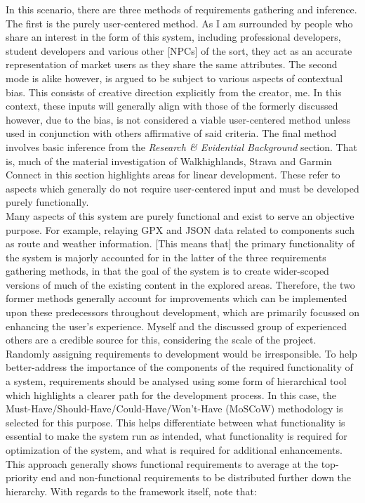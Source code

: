 \documentclass[11pt, english]{article}
\begin{document}
	In this scenario, there are three methods of requirements gathering and inference. The first is the purely user-centered method. As I am surrounded by people who share an interest in the form of this system, including professional developers, student developers and various other [NPCs] of the sort, they act as an accurate representation of market users as they share the same attributes. The second mode is alike however, is argued to be subject to various aspects of contextual bias. This consists of creative direction explicitly from the creator, me. In this context, these inputs will generally align with those of the formerly discussed however, due to the bias, is not considered a viable user-centered method unless used in conjunction with others affirmative of said criteria. The final method involves basic inference from the \textit{Research \& Evidential Background} section. That is, much of the material investigation of Walkhighlands, Strava and Garmin Connect in this section highlights areas for linear development. These refer to aspects which generally do not require user-centered input and must be developed purely functionally.\\

	Many aspects of this system are purely functional and exist to serve an objective purpose. For example, relaying GPX and JSON data related to components such as route and weather information. [This means that] the primary functionality of the system is majorly accounted for in the latter of the three requirements gathering methods, in that the goal of the system is to create wider-scoped versions of much of the existing content in the explored areas. Therefore, the two former methods generally account for improvements which can be implemented upon these predecessors throughout development, which are primarily focussed on enhancing the user's experience. Myself and the discussed group of experienced others are a credible source for this, considering the scale of the project.\\

	Randomly assigning requirements to development would be irresponsible. To help better-address the importance of the components of the required functionality of a system, requirements should be analysed using some form of hierarchical tool which highlights a clearer path for the development process. In this case, the Must-Have/Should-Have/Could-Have/Won't-Have (MoSCoW) methodology is selected for this purpose. This helps differentiate between what functionality is essential to make the system run as intended, what functionality is required for optimization of the system, and what is required for additional enhancements. This approach generally shows functional requirements to average at the top-priority end and non-functional requirements to be distributed further down the hierarchy. With regards to the framework itself, note that:
\end{document}
